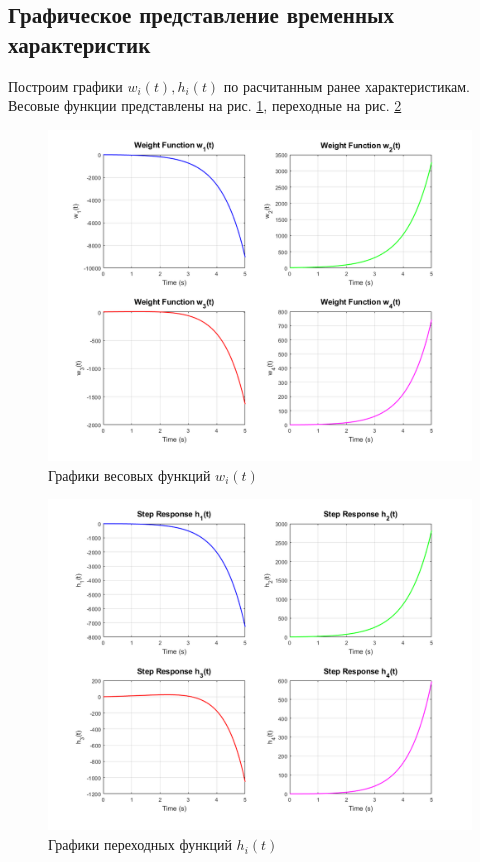\documentclass[a4paper, 12pt]{article}
\begin{document}
    \subsection{Графическое представление временных характеристик}
    Построим графики $w_i(t),h_i(t)$ по расчитанным ранее характеристикам.
    Весовые функции представлены на рис. \ref{fig:1task_wi}, переходные на рис. \ref{fig:1task_hi}
    \begin{figure}[H]
        \centering
        \includegraphics[scale=0.585]{1task_wi.png}
        \captionsetup{skip=0pt}
        \caption{Графики весовых функций $w_i(t)$}
        \label{fig:1task_wi}
    \end{figure}
    \begin{figure}[H]
        \centering
        \includegraphics[scale=0.585]{1task_hi.png}
        \captionsetup{skip=0pt}
        \caption{Графики переходных функций $h_i(t)$}
        \label{fig:1task_hi}
    \end{figure}
\end{document}
